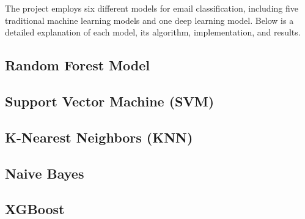 The project employs six different models for email classification, including five traditional machine learning models and one deep learning model.
Below is a detailed explanation of each model, its algorithm, implementation, and results.

\subsection{Random Forest Model}
\label{subsec:random-forest-model}


\subsection{Support Vector Machine (SVM)}
\label{subsec:support-vector-machine}


\subsection{K-Nearest Neighbors (KNN)}
\label{subsec:k-nearest-neighbors}


\subsection{Naive Bayes}
\label{subsec:naive-bayes}


\subsection{XGBoost}
\label{subsec:xgboost}
